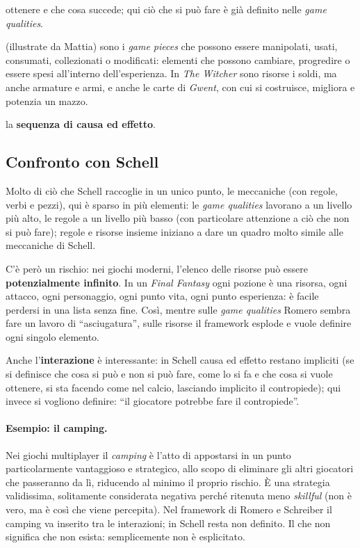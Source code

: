 \begin{description}
        ottenere e che cosa succede; qui ciò che si può fare è già definito
        nelle \emph{game qualities}.
  \item[Risorse] (illustrate da Mattia) sono i \emph{game pieces} che possono
        essere manipolati, usati, consumati, collezionati o modificati:
        elementi che possono cambiare, progredire o essere spesi all'interno
        dell'esperienza. In \emph{The Witcher} sono risorse i soldi, ma anche
        armature e armi, e anche le carte di \emph{Gwent}, con cui si
        costruisce, migliora e potenzia un mazzo.
  \item[Interazione] la \textbf{sequenza di causa ed effetto}.
\end{description}

\subsection{Confronto con Schell}

Molto di ciò che Schell raccoglie in un unico punto, le meccaniche (con
regole, verbi e pezzi), qui è sparso in più elementi: le \emph{game qualities}
lavorano a un livello più alto, le regole a un livello più basso (con
particolare attenzione a ciò che non si può fare); regole e risorse insieme
iniziano a dare un quadro molto simile alle meccaniche di Schell.

C'è però un rischio: nei giochi moderni, l'elenco delle risorse può essere
\textbf{potenzialmente infinito}. In un \emph{Final Fantasy} ogni pozione è
una risorsa, ogni attacco, ogni personaggio, ogni punto vita, ogni punto
esperienza: è facile perdersi in una lista senza fine. Così, mentre sulle
\emph{game qualities} Romero sembra fare un lavoro di ``asciugatura'', sulle
risorse il framework esplode e vuole definire ogni singolo elemento.

Anche l'\textbf{interazione} è interessante: in Schell causa ed effetto
restano impliciti (se si definisce che cosa si può e non si può fare, come lo
si fa e che cosa si vuole ottenere, si sta facendo come nel calcio, lasciando
implicito il contropiede); qui invece si vogliono definire: ``il giocatore
potrebbe fare il contropiede''.

\paragraph{Esempio: il camping.} Nei giochi multiplayer il \emph{camping} è
l'atto di appostarsi in un punto particolarmente vantaggioso e strategico,
allo scopo di eliminare gli altri giocatori che passeranno da lì, riducendo al
minimo il proprio rischio. È una strategia validissima, solitamente
considerata negativa perché ritenuta meno \emph{skillful} (non è vero, ma è
così che viene percepita). Nel framework di Romero e Schreiber il camping va
inserito tra le interazioni; in Schell resta non definito. Il che non
significa che non esista: semplicemente non è esplicitato.

